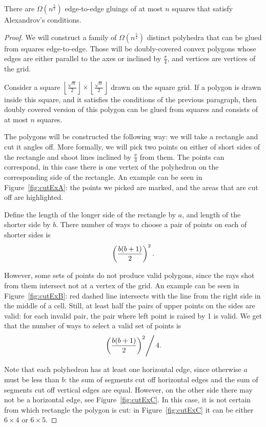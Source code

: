 \documentclass[a4paper,11pt]{article}
\begin{document}
\begin{theorem} \label{thm:n52}
	There are $\Omega \left( n^{\frac52} \right)$ edge-to-edge gluings of at most $n$ squares that satisfy Alexandrov's conditions.
\end{theorem}

\begin{proof}
We will construct a family of $\Omega \left( n^{\frac52} \right)$ distinct polyhedra that can be glued from squares edge-to-edge. Those will be doubly-covered convex polygons whose edges are either parallel to the axes or inclined by $\frac{\pi}{4}$, and vertices are vertices of the grid.

Consider a square $\left \lfloor \frac{\sqrt n}{2} \right \rfloor \times \left \lfloor \frac{\sqrt n}{2} \right \rfloor$ drawn on the square grid. If a polygon is drawn inside this square, and it satisfies the conditions of the previous paragraph, then doubly covered version of this polygon can be glued from squares and consists of at most $n$ squares.

The polygons will be constructed the following way: we will take a rectangle and cut it angles off. More formally, we will pick two points on either of short sides of the rectangle and shoot lines inclined by $\frac{\pi}{4}$ from them. The points can correspond, in this case there is one vertex of the polyhedron on the corresponding side of the rectangle. An example can be seen in Figure~\ref{fig:cutExA}: the points we picked are marked, and the areas that are cut off are highlighted.



Define the length of the longer side of the rectangle by $a$, and length of the shorter side by $b$. There number of ways to choose a pair of points on each of shorter sides is
\[ \left( \frac{b(b+1)}{2} \right)^2. \]

However, some sets of points do not produce valid polygons, since the rays shot from them intersect not at a vertex of the grid. An example can be seen in Figure~\ref{fig:cutExB}: red dashed line intersects with the line from the right side in the middle of a cell. Still, at least half the pairs of upper points on the sides are valid: for each invalid pair, the pair where left point is raised by 1 is valid. We get that the number of ways to select a valid set of points is
\[ \left. \left( \frac{b(b+1)}{2} \right)^2 \right/ 4 . \]

Note that each polyhedron has at least one horizontal edge, since otherwise $a$ must be less than $b$: the sum of segments cut off horizontal edges and the sum of segments cut off vertical edges are equal. However, on the other side there may not be a horizontal edge, see Figure~\ref{fig:cutExC}. In this case, it is not certain from which rectangle the polygon is cut: in Figure~\ref{fig:cutExC} it can be either $6 \times 4$ or $6 \times 5$.


\end{proof}
\end{document}
